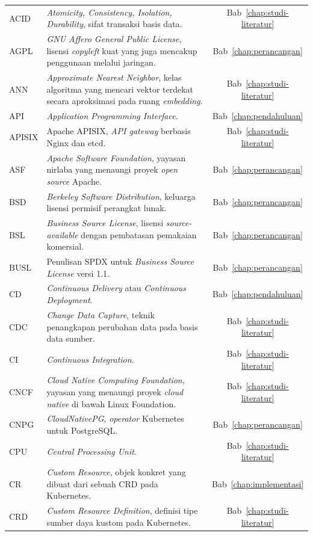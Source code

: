 \begin{longtable}{@{} l >{\raggedright\arraybackslash}p{8cm} c @{}}
ACID & \textit{Atomicity, Consistency, Isolation, Durability}, sifat transaksi basis data. & Bab~\ref{chap:studi-literatur} \\
AGPL & \textit{GNU Affero General Public License}, lisensi \textit{copyleft} kuat yang juga mencakup penggunaan melalui jaringan. & Bab~\ref{chap:perancangan} \\
ANN & \textit{Approximate Nearest Neighbor}, kelas algoritma yang mencari vektor terdekat secara aproksimasi pada ruang \textit{embedding}. & Bab~\ref{chap:studi-literatur} \\
API & \textit{Application Programming Interface}. & Bab~\ref{chap:pendahuluan} \\
APISIX & Apache APISIX, \textit{API gateway} berbasis Nginx dan etcd. & Bab~\ref{chap:studi-literatur} \\
ASF & \textit{Apache Software Foundation}, yayasan nirlaba yang menaungi proyek \textit{open source} Apache. & Bab~\ref{chap:perancangan} \\
BSD & \textit{Berkeley Software Distribution}, keluarga lisensi permisif perangkat lunak. & Bab~\ref{chap:perancangan} \\
BSL & \textit{Business Source License}, lisensi \textit{source-available} dengan pembatasan pemakaian komersial. & Bab~\ref{chap:perancangan} \\
BUSL & Penulisan SPDX untuk \textit{Business Source License} versi 1.1. & Bab~\ref{chap:perancangan} \\
CD & \textit{Continuous Delivery} atau \textit{Continuous Deployment}. & Bab~\ref{chap:pendahuluan} \\
CDC & \textit{Change Data Capture}, teknik penangkapan perubahan data pada basis data sumber. & Bab~\ref{chap:studi-literatur} \\
CI & \textit{Continuous Integration}. & Bab~\ref{chap:studi-literatur} \\
CNCF & \textit{Cloud Native Computing Foundation}, yayasan yang menaungi proyek \textit{cloud native} di bawah Linux Foundation. & Bab~\ref{chap:studi-literatur} \\
CNPG & \textit{CloudNativePG}, \textit{operator} Kubernetes untuk PostgreSQL. & Bab~\ref{chap:perancangan} \\
CPU & \textit{Central Processing Unit}. & Bab~\ref{chap:studi-literatur} \\
CR & \textit{Custom Resource}, objek konkret yang dibuat dari sebuah CRD pada Kubernetes. & Bab~\ref{chap:implementasi} \\
CRD & \textit{Custom Resource Definition}, definisi tipe sumber daya kustom pada Kubernetes. & Bab~\ref{chap:studi-literatur} \\

\end{longtable}
